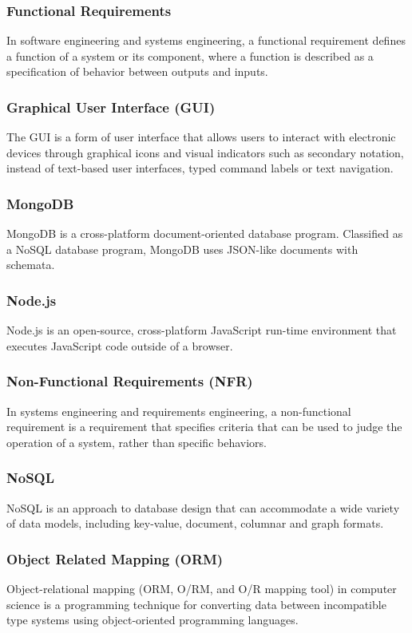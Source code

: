 \subsubsection*{Functional Requirements}
In software engineering and systems engineering, a functional requirement defines a function of a system or its component, where a function is described as a specification of behavior between outputs and inputs.

\subsubsection*{Graphical User Interface (GUI)}
The GUI is a form of user interface that allows users to interact with electronic devices through graphical icons and visual indicators such as secondary notation, instead of text-based user interfaces, typed command labels or text navigation.

\subsubsection*{MongoDB}
MongoDB is a cross-platform document-oriented database program. Classified as a NoSQL database program, MongoDB uses JSON-like documents with schemata.

\subsubsection*{Node.js}
Node.js is an open-source, cross-platform JavaScript run-time environment that executes JavaScript code outside of a browser.

\subsubsection*{Non-Functional Requirements (NFR)}
In systems engineering and requirements engineering, a non-functional requirement is a requirement that specifies criteria that can be used to judge the operation of a system, rather than specific behaviors.

\subsubsection*{NoSQL}
NoSQL is an approach to database design that can accommodate a wide variety of data models, including key-value, document, columnar and graph formats.

\subsubsection*{Object Related Mapping (ORM)}
Object-relational mapping (ORM, O/RM, and O/R mapping tool) in computer science is a programming technique for converting data between incompatible type systems using object-oriented programming languages.

